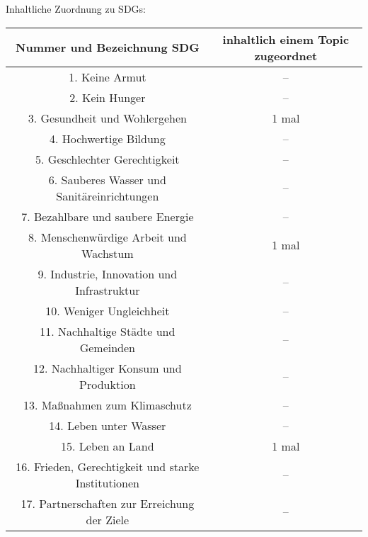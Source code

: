 \documentclass[letterpaper]{article}
\begin{document}
Inhaltliche Zuordnung zu SDGs: \\
\begin{tabular}{ |c|c|} 
\hline
Nummer und Bezeichnung SDG & inhaltlich einem Topic zugeordnet\\
\hline
1. Keine Armut & -- \\ 
\hline 
2. Kein Hunger & -- \\
\hline
3. Gesundheit und Wohlergehen & 1 mal \\
\hline
4. Hochwertige Bildung & --  \\
\hline 
5. Geschlechter Gerechtigkeit & -- \\
\hline
6. Sauberes Wasser und Sanitäreinrichtungen & -- \\
\hline
7. Bezahlbare und saubere Energie & -- \\
\hline 
8. Menschenwürdige Arbeit und Wachstum & 1 mal \\
\hline 
9. Industrie, Innovation und Infrastruktur & -- \\
\hline 
10. Weniger Ungleichheit & -- \\
\hline 
11. Nachhaltige Städte und Gemeinden & -- \\
\hline 
12. Nachhaltiger Konsum und Produktion & -- \\
\hline 
13. Maßnahmen zum Klimaschutz & -- \\
\hline 
14. Leben unter Wasser & -- \\
\hline 
15. Leben an Land & 1 mal \\
\hline 
16. Frieden, Gerechtigkeit und starke Institutionen & -- \\
\hline 
17. Partnerschaften zur Erreichung der Ziele & -- \\
\hline 
\end{tabular}
\end{document}
